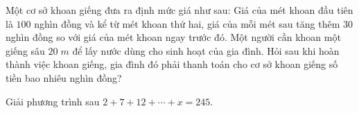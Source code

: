 \begin{bt}%
	Một cơ sở khoan giếng đưa ra định mức giá như sau: Giá của mét khoan đầu tiên là $100$ nghìn đồng và kể từ mét khoan thứ hai, giá của mỗi mét sau tăng thêm $30$ nghìn đồng so với giá của mét khoan ngay trước đó. Một người cần khoan một giếng sâu $20\; m$ để lấy nước dùng cho sinh hoạt của gia đình. Hỏi sau khi hoàn thành việc khoan giếng, gia đình đó phải thanh toán cho cơ sở khoan giếng số tiền bao nhiêu nghìn đồng?
\end{bt}
\begin{bt}%
	Giải phương trình sau $2+7+12+\cdots+x=245$.
\end{bt}


